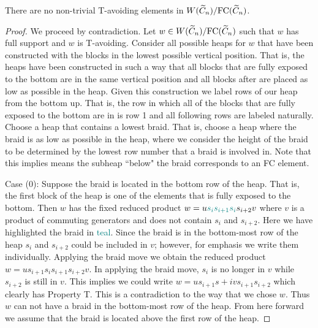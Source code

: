 \begin{theorem}\label{thm:TavoidC}
There are no non-trivial T-avoiding elements in $W(\widetilde{C}_n)/\mathrm{FC}(\widetilde{C}_n)$. 	
\begin{proof}
	We proceed by contradiction. Let $w \in W(\widetilde{C}_n)/\mathrm{FC}(\widetilde{C}_n)$ such that $w$ has full support and $w$ is T-avoiding. Consider all possible heaps for $w$ that have been constructed with the blocks in the lowest possible vertical position. That is, the heaps have been constructed in such a way that all blocks that are fully exposed to the bottom are in the same vertical position and all blocks after are placed as low as possible in the heap. Given this construction we label rows of our heap from the bottom up. That is, the row in which all of the blocks that are fully exposed to the bottom are in is row 1 and all following rows are labeled naturally. Choose a heap that contains a lowest braid. That is, choose a heap where the braid is as low as possible in the heap, where we consider the height of the braid to be determined by the lowest row number that a braid is involved in. Note that this implies means the subheap ``below" the braid corresponds to an FC element. 
	
	Case (0): Suppose the braid is located in the bottom row of the heap. That is, the first block of the heap is one of the elements that is fully exposed to the bottom. Then $w$ has the fixed reduced product $w=u\textcolor{teal}{s_is_{i+1}s_i}s_{i+2}v$ where $v$ is a product of commuting generators and does not contain $s_i$ and $s_{i+2}$. Here we have highlighted the braid in \textcolor{teal}{teal}. Since the braid is in the bottom-most row of the heap $s_i$ and $s_{i+2}$ could be included in $v$; however, for emphasis we write them individually. Applying the braid move we obtain the reduced product $w=us_{i+1}s_is_{i+1}s_{i+2}v$.  In applying the braid move, $s_i$ is no longer in $v$ while $s_{i+2}$ is still in $v$. This implies we could write $w=us_{i+1}s+ivs_{i+1}s_{i+2}$  which clearly has Property T. This is a contradiction to the way that we chose $w$. Thus $w$ can not have a braid in the bottom-most row of the heap. From here forward we assume that the braid is located above the first row of the heap.	  
	

\end{proof}
\end{theorem}
